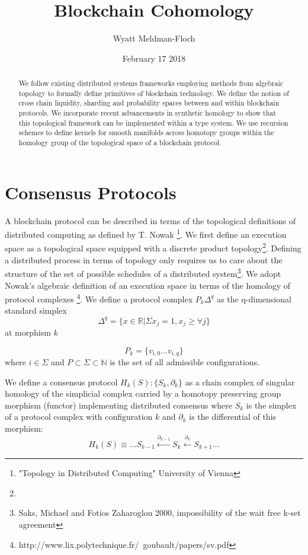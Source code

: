 \documentclass{article}
\title{Blockchain Cohomology}
\author{Wyatt Meldman-Floch}
\date{February 17 2018}
\begin{document}
\maketitle

\begin{abstract}
We follow existing distributed systems frameworks employing methods from algebraic topology to formally define primitives of blockchain technology. We define the notion of cross chain liquidity, sharding and probability spaces between and within blockchain protocols. We incorporate recent advancements in synthetic homology to show that this topological framework can be implemented within a type system. We use recursion schemes to define kernels for smooth manifolds across homotopy groups within the homology group of the topological space of a blockchain protocol. 

\end{abstract}

\section{Consensus Protocols}
A blockchain protocol can be described in terms of the topological definitions of distributed computing as defined by T. Nowak \footnote{"Topology in Distributed Computing" University of Vienna}. We first define an execution space as a topological space equipped with a discrete product topology\footnote{}. Defining a distributed process in terms of topology only requires us to care about the structure of the set of possible schedules of a distributed system\footnote{Saks, Michael and Fotios Zaharoglou 2000, impossibility of the wait free k-set agreement}. We adopt Nowak's algebraic definition of an execution space in terms of the homology of protocol complexes \footnote{http://www.lix.polytechnique.fr/~goubault/papers/sv.pdf}. We define a protocol complex $P_k{\Delta^q}$ as the q-dimensional standard simplex
\begin{equation} \label{eq1}
\Delta^q = \{x \in \mathbb{R} | \Sigma x_j = 1, x_j \geq \forall j \}
\end{equation} \label{eq1}
at morphism $k$ 

\begin{equation} \label{eq1}
P_k = \{v_{i,0} \dots v_{i,q}\}
\end{equation} \label{eq1}
where $i \in \Sigma$ and $P \subset \Sigma \subset \mathbb{N}$ is the set of all admissible configurations. 
 
We define a consensus protocol $H_{k}(S):\{S_k, \partial_k\}$ as a chain complex of singular homology of the simplicial complex carried by a homotopy preserving group morphism (functor) implementing distributed consensus where $S_k$ is the simplex of a protocol complex with configuration $k$ and $\partial_k$ is the differential of this morphism:
\begin{equation} \label{eq1}
H_{k}(S) \equiv \dots S_{k-1}\xleftarrow {\partial_{k-1}} S_{k}\xleftarrow {\partial_{k}} S_{k+1} \dots
\end{equation} \label{eq1}
\end{document}
